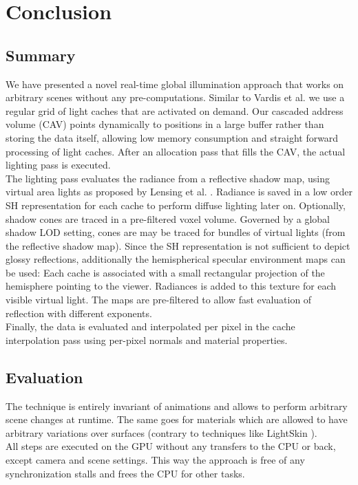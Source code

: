 \documentclass[thesis.tex]{subfiles}
\begin{document}
\chapter{Conclusion}\label{chap:concl}

\section{Summary}
We have presented a novel real-time global illumination approach that works on arbitrary scenes without any pre-computations.
Similar to Vardis et al. \cite{bib:radiancecachechromaticcompression} we use a regular grid of light caches that are activated on demand.
Our cascaded address volume (CAV) points dynamically to positions in a large buffer rather than storing the data itself, allowing low memory consumption and straight forward processing of light caches.
After an allocation pass that fills the CAV, the actual lighting pass is executed.
\\
The lighting pass evaluates the radiance from a reflective shadow map, using virtual area lights as proposed by Lensing et al. \cite{bib:LightskinPaper}.
Radiance is saved in a low order SH representation for each cache to perform diffuse lighting later on.
Optionally, shadow cones are traced in a pre-filtered voxel volume.
Governed by a global shadow LOD setting, cones are may be traced for bundles of virtual lights (from the reflective shadow map).
Since the SH representation is not sufficient to depict glossy reflections, additionally the hemispherical specular environment maps can be used:
Each cache is associated with a small rectangular projection of the hemisphere pointing to the viewer.
Radiances is added to this texture for each visible virtual light.
The maps are pre-filtered to allow fast evaluation of reflection with different exponents.
\\
Finally, the data is evaluated and interpolated per pixel in the cache interpolation pass using per-pixel normals and material properties.


\section{Evaluation}

The technique is entirely invariant of animations and allows to perform arbitrary scene changes at runtime.
The same goes for materials which are allowed to have arbitrary variations over surfaces (contrary to techniques like LightSkin \cite{bib:LightskinPaper}).
\\
All steps are executed on the GPU without any transfers to the CPU or back, except camera and scene settings.
This way the approach is free of any synchronization stalls and frees the CPU for other tasks.
\end{document}
